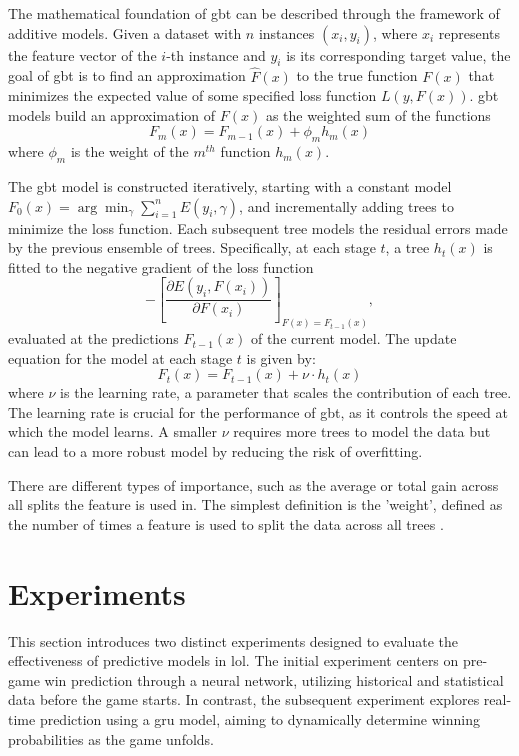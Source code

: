 \documentclass[12pt, a4paper, headinclude, twoside, plainheadsepline, open=right, numbers=noenddot, hidelinks, toc=listof, toc=bibliography]{scrreprt}
\begin{document}
The mathematical foundation of \ac{gbt} can be described through the framework of additive models. 
Given a dataset with \(n\) instances \((x_i, y_i)\), where \(x_i\) represents the feature vector of the \(i\)-th instance and \(y_i\) is its corresponding target value, the goal of \ac{gbt} is to find an approximation \(\hat{F}(x)\) to the true function \(F(x)\) that minimizes the expected value of some specified loss function \(L(y, F(x))\). 
\Ac{gbt} models build an approximation of $F(x)$ as the weighted sum of the functions
\begin{equation}
F_m(x) = F_{m-1}(x) + \phi_m h_m(x)
\end{equation}
where $\phi_m$ is the weight of the $m^{th}$ function $h_m(x)$\cite{bentejacComparativeAnalysisGradient2021}.

The \ac{gbt} model is constructed iteratively, starting with a constant model \(F_0(x) = \arg\min_{\gamma} \sum_{i=1}^{n} E(y_i, \gamma)\), and incrementally adding trees to minimize the loss function. 
Each subsequent tree models the residual errors made by the previous ensemble of trees. Specifically, at each stage \(t\), a tree \(h_t(x)\) is fitted to the negative gradient of the loss function
\begin{equation}
-\left[\frac{\partial E(y_i, F(x_i))}{\partial F(x_i)}\right]_{F(x)=F_{t-1}(x)},
\end{equation}
evaluated at the predictions \(F_{t-1}(x)\) of the current model.
The update equation for the model at each stage \(t\) is given by:
\begin{equation}
F_t(x) = F_{t-1}(x) + \nu \cdot h_t(x)
\end{equation}
where \(\nu\) is the learning rate, a parameter that scales the contribution of each tree. 
The learning rate is crucial for the performance of \ac{gbt}, as it controls the speed at which the model learns. 
A smaller \(\nu\) requires more trees to model the data but can lead to a more robust model by reducing the risk of overfitting.

There are different types of importance, such as the average or total gain across all splits the feature is used in.
The simplest definition is the 'weight', defined as the number of times a feature is used to split the data across all trees \cite{chenXGBoostScalableTree2016}.

\chapter{Experiments}
\label{chap:experiments}
This section introduces two distinct experiments designed to evaluate the effectiveness of predictive models in \ac{lol}. The initial experiment centers on pre-game win prediction through a neural network, utilizing historical and statistical data before the game starts. In contrast, the subsequent experiment explores real-time prediction using a \ac{gru} model, aiming to dynamically determine winning probabilities as the game unfolds.
\end{document}
